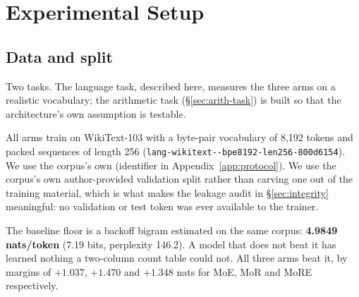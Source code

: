 \section{Experimental Setup}
\label{sec:setup}

\subsection{Data and split}
\label{sec:data}

Two tasks. The language task, described here, measures the three arms on a
realistic vocabulary; the arithmetic task (\S\ref{sec:arith-task}) is built so
that the architecture's own assumption is testable.

All arms train on WikiText-103 \citep{merity2017wikitext} with a byte-pair
vocabulary of 8{,}192 tokens and packed sequences of length 256
(\texttt{lang-\allowbreak wikitext--\allowbreak bpe8192-\allowbreak len256-\allowbreak 800d6154}). We use the corpus's own
(identifier in Appendix~\ref{app:protocol}). We use the corpus's own
author-provided validation split rather than carving one out of the training
material, which is what makes the leakage audit in \S\ref{sec:integrity}
meaningful: no validation or test token was ever available to the trainer.

The baseline floor is a backoff bigram estimated on the same corpus:
\textbf{4.9849 nats/token} (7.19 bits, perplexity 146.2). A model that does not
beat it has learned nothing a two-column count table could not. All three arms
beat it, by margins of $+1.037$, $+1.470$ and $+1.348$ nats for MoE, MoR and MoRE
respectively.

